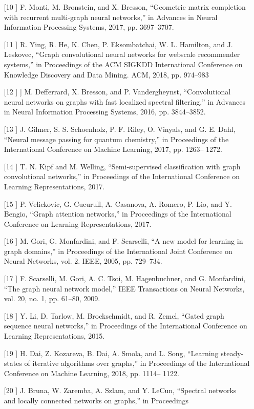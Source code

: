 \documentclass[UTF8]{ctexart}
\begin{document}
\begin{itemize}
\item [[10]]
F. Monti, M. Bronstein, and X. Bresson, “Geometric matrix completion with recurrent multi-graph neural networks,” in Advances
in Neural Information Processing Systems, 2017, pp. 3697–3707.
\item [[11]]
R. Ying, R. He, K. Chen, P. Eksombatchai, W. L. Hamilton, and
J. Leskovec, “Graph convolutional neural networks for webscale recommender systems,” in Proceedings of the ACM SIGKDD
International Conference on Knowledge Discovery and Data Mining.
ACM, 2018, pp. 974–983
\item [[12]]
] M. Defferrard, X. Bresson, and P. Vandergheynst, “Convolutional
neural networks on graphs with fast localized spectral filtering,”
in Advances in Neural Information Processing Systems, 2016, pp.
3844–3852.
\item [[13]]
J. Gilmer, S. S. Schoenholz, P. F. Riley, O. Vinyals, and G. E. Dahl,
“Neural message passing for quantum chemistry,” in Proceedings
of the International Conference on Machine Learning, 2017, pp. 1263–
1272.
\item [[14]]
T. N. Kipf and M. Welling, “Semi-supervised classification with
graph convolutional networks,” in Proceedings of the International
Conference on Learning Representations, 2017.
\item [[15]]
 P. Velickovic, G. Cucurull, A. Casanova, A. Romero, P. Lio,
and Y. Bengio, “Graph attention networks,” in Proceedings of the
International Conference on Learning Representations, 2017.
\item [[16]]
M. Gori, G. Monfardini, and F. Scarselli, “A new model for
learning in graph domains,” in Proceedings of the International Joint
Conference on Neural Networks, vol. 2. IEEE, 2005, pp. 729–734.
\item [[17]]
F. Scarselli, M. Gori, A. C. Tsoi, M. Hagenbuchner, and G. Monfardini, “The graph neural network model,” IEEE Transactions on
Neural Networks, vol. 20, no. 1, pp. 61–80, 2009.
\item [[18]]
Y. Li, D. Tarlow, M. Brockschmidt, and R. Zemel, “Gated graph
sequence neural networks,” in Proceedings of the International
Conference on Learning Representations, 2015.
\item [[19]]
H. Dai, Z. Kozareva, B. Dai, A. Smola, and L. Song, “Learning
steady-states of iterative algorithms over graphs,” in Proceedings
of the International Conference on Machine Learning, 2018, pp. 1114–
1122.
\item [[20]]
J. Bruna, W. Zaremba, A. Szlam, and Y. LeCun, “Spectral networks and locally connected networks on graphs,” in Proceedings

\end{itemize}
\end{document}
